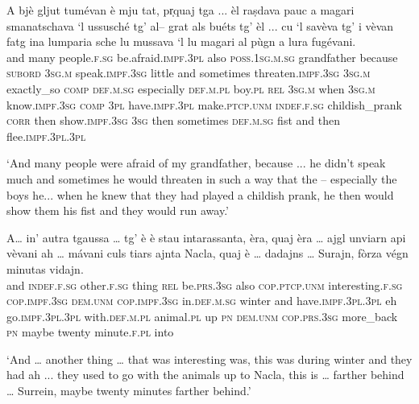 \begin{linenumbers}
\gll  A bjè gljut tumévan è mju tat, pr̩quaj tga ... èl raṣdava pauc a magari smanatschava `l ussusché tg’ al– grat als buéts tg’ èl ... cu `l savèva tg’ i vèvan fatg ina lumparia sche lu mussava `l lu magari al pùgn a lura fugévani.  \\
and many people.\textsc{f.sg} be.afraid.\textsc{impf.3pl} also \textsc{poss.1sg.m.sg} grandfather because \textsc{subord} {} \textsc{3sg.m} speak.\textsc{impf.3sg} little and sometimes threaten.\textsc{impf.3sg} \textsc{3sg.m} exactly\_so \textsc{comp} \textsc{def.m.sg} especially \textsc{def.m.pl} boy.\textsc{pl} \textsc{rel} \textsc{3sg.m} {} when \textsc{3sg.m} know.\textsc{impf.3sg} \textsc{comp} \textsc{3pl} have.\textsc{impf.3pl} make.\textsc{ptcp.unm} \textsc{indef.f.sg} childish\_prank \textsc{corr} then show.\textsc{impf.3sg} \textsc{3sg} then sometimes \textsc{def.m.sg} fist and then flee.\textsc{impf.3pl.3pl} \\
\end{linenumbers}
\medskip
\glt `And many people were afraid of my grandfather, because ... he didn’t speak much and sometimes he would threaten in such a way that the – especially the boys he... when he knew that they had played a childish prank, he then would show them his fist and they would run away.'
\medskip

\begin{linenumbers}
\gll  A… in’ autra tgaussa … tg' è è stau\footnotemark{} intarassanta, èra, quaj èra … ajgl unviarn api vèvani ah … mávani culs tiars ajnta Nacla, quaj è …  dadajns … Surajn, fòrza végn minutas vidajn.    \\
and \textsc{indef.f.sg} other.\textsc{f.sg} thing {} \textsc{rel} be.\textsc{prs.3sg} also \textsc{cop.ptcp.unm} interesting.\textsc{f.sg} \textsc{cop.impf.3sg} \textsc{dem.unm} \textsc{cop.impf.3sg} {}  in.\textsc{def.m.sg} winter and have.\textsc{impf.3pl.3pl} eh {} go.\textsc{impf.3pl.3pl} with.\textsc{def.m.pl} animal.\textsc{pl} up \textsc{pn} \textsc{dem.unm} \textsc{cop.prs.3sg} {} more\_back {} \textsc{pn} maybe twenty minute.\textsc{f.pl} into\\
\end{linenumbers}
\medskip
\glt `And … another thing … that was interesting was, this was during winter and they had ah ... they used to go with the animals up to Nacla, this is … farther behind … Surrein, maybe twenty minutes farther behind.'
\medskip

